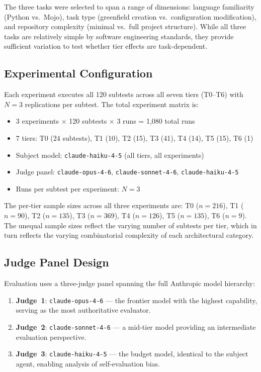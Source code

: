 \documentclass[11pt]{article}
\begin{document}
The three tasks were selected to span a range of dimensions: language
familiarity (Python vs.\ Mojo), task type (greenfield creation vs.\
configuration modification), and repository complexity (minimal vs.\ full
project structure). While all three tasks are relatively simple by software
engineering standards, they provide sufficient variation to test whether tier
effects are task-dependent.

\subsection{Experimental Configuration}
\label{sec:exp_config}

Each experiment executes all 120 subtests across all seven tiers (T0--T6) with
$N=3$ replications per subtest. The total experiment matrix is:

\begin{itemize}
  \item 3 experiments $\times$ 120 subtests $\times$ 3 runs = 1,080 total runs
  \item 7 tiers: T0 (24 subtests), T1 (10), T2 (15), T3 (41), T4 (14),
    T5 (15), T6 (1)
  \item Subject model: \texttt{claude-haiku-4-5} (all tiers, all experiments)
  \item Judge panel: \texttt{claude-opus-4-6}, \texttt{claude-sonnet-4-6},
    \texttt{claude-haiku-4-5}
  \item Runs per subtest per experiment: $N=3$
\end{itemize}

The per-tier sample sizes across all three experiments are: T0 ($n=216$),
T1 ($n=90$), T2 ($n=135$), T3 ($n=369$), T4 ($n=126$), T5 ($n=135$),
T6 ($n=9$). The unequal sample sizes reflect the varying number of subtests
per tier, which in turn reflects the varying combinatorial complexity of each
architectural category.



\subsection{Judge Panel Design}
\label{sec:judge_panel}

Evaluation uses a three-judge panel spanning the full Anthropic model
hierarchy:

\begin{enumerate}
  \item \textbf{Judge~1}: \texttt{claude-opus-4-6} --- the frontier model with
    the highest capability, serving as the most authoritative evaluator.
  \item \textbf{Judge~2}: \texttt{claude-sonnet-4-6} --- a mid-tier model
    providing an intermediate evaluation perspective.
  \item \textbf{Judge~3}: \texttt{claude-haiku-4-5} --- the budget model,
    identical to the subject agent, enabling analysis of self-evaluation bias.
\end{enumerate}
\end{document}
